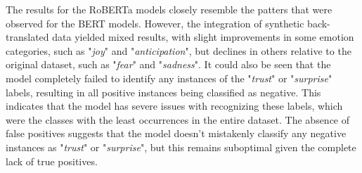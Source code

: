 \documentclass[manuscript]{clv3}
\begin{document}
The results for the RoBERTa models closely resemble the patters that were observed for the BERT models. However, the integration of synthetic back-translated data yielded mixed results, with slight improvements in some emotion categories, such as "\textit{joy}" and "\textit{anticipation}", but declines in others relative to the original dataset, such as "\textit{fear}" and "\textit{sadness}". It could also be seen that the model completely failed to identify any instances of the "\textit{trust}" or "\textit{surprise}" labels, resulting in all positive instances being classified as negative. This indicates that the model has severe issues with recognizing these labels, which were the classes with the least occurrences in the entire dataset. The absence of false positives suggests that the model doesn't mistakenly classify any negative instances as "\textit{trust}" or "\textit{surprise}", but this remains suboptimal given the complete lack of true positives. 
\end{document}
